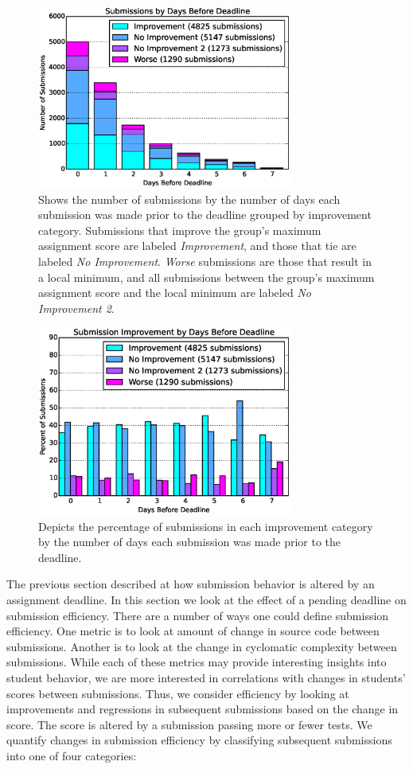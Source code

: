 \begin{figure}[!t]
\centering \includegraphics[width=3.3in]{graphs/Submissions_by_Days_Before_Deadline.eps}
\caption{Shows the number of submissions by the number of days each submission
  was made prior to the deadline grouped by improvement category.  Submissions
  that improve the group's maximum assignment score are labeled
  \emph{Improvement}, and those that tie are labeled \emph{No
    Improvement}. \emph{Worse} submissions are those that result in a local
  minimum, and all submissions between the group's maximum assignment score and
  the local minimum are labeled \emph{No Improvement 2}.}
\end{figure}

\begin{figure}[!t]
\centering
\includegraphics[width=3.3in]{graphs/Submission_Improvement_by_Days_Before_Deadline.eps}
\caption{Depicts the percentage of submissions in each improvement category by
  the number of days each submission was made prior to the deadline.}
\end{figure}

The previous section described at how submission behavior is altered by an
assignment deadline. In this section we look at the effect of a pending
deadline on submission efficiency. There are a number of ways one could define
submission efficiency. One metric is to look at amount of change in source code
between submissions. Another is to look at the change in cyclomatic complexity
between submissions. While each of these metrics may provide interesting
insights into student behavior, we are more interested in correlations with
changes in students' scores between submissions. Thus, we consider efficiency
by looking at improvements and regressions in subsequent submissions based on
the change in score. The score is altered by a submission passing more or fewer
tests. We quantify changes in submission efficiency by classifying subsequent
submissions into one of four categories:

